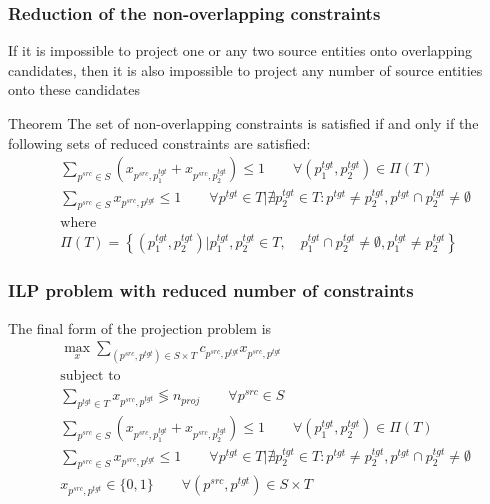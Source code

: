 \documentclass{beamer}
\newcommand{\src}[1]{#1^{src}}
\newcommand{\tgt}[1]{#1^{tgt}}
\begin{document}
\begin{frame}
  \frametitle{Reduction of the non-overlapping constraints}

  If it is impossible to project one or any two source entities onto overlapping
  candidates, then it is also impossible to project any number of source entities
  onto these candidates

  \begin{block}{Theorem}
    The set of non-overlapping constraints is satisfied if and only if
    the following sets of reduced constraints are satisfied:
    \begin{align*}
      & \sum\limits_{\src{p} \in S} (x_{\src{p}, \tgt{p_1}} + x_{\src{p}, \tgt{p_2}}) \leq 1
      \qquad \forall (\tgt{p_1}, \tgt{p_2}) \in \Pi(T) \\
      & \sum\limits_{\src{p} \in S} x_{\src{p}, \tgt{p}} \leq 1
      \qquad \forall \tgt{p} \in T \Big| \nexists \tgt{p_2} \in T: \tgt{p} \neq \tgt{p_2}, \tgt{p} \cap \tgt{p_2} \neq \emptyset                                             \\
      & \text{where} \\
      & \Pi(T) = \left\{ (\tgt{p_1}, \tgt{p_2}) \Big| \tgt{p_1}, \tgt{p_2} \in T,
        \quad \tgt{p_1} \cap \tgt{p_2} \neq \emptyset,
      \tgt{p_1} \neq \tgt{p_2} \right\}
    \end{align*}
  \end{block}

\end{frame}

\begin{frame}
  \frametitle{ILP problem with reduced number of constraints}
  The final form of the projection problem is
  \begin{align*}
    & \max\limits_x \sum\limits_{(\src{p}, \tgt{p}) \in S \times T} c_{\src{p}, \tgt{p}} x_{\src{p}, \tgt{p}}                                                                                                                       \\
    & \text{subject to}                                                                                                                                                                                                             \\
    & \sum\limits_{\tgt{p} \in T} x_{\src{p}, \tgt{p}} \lessgtr n_{proj}
    \qquad \forall \src{p} \in S                                                                                               \\
    & \sum\limits_{\src{p} \in S} (x_{\src{p}, \tgt{p_1}} + x_{\src{p}, \tgt{p_2}}) \leq 1
    \qquad \forall (\tgt{p_1}, \tgt{p_2}) \in \Pi(T)                                                                           \\
    & \sum\limits_{\src{p} \in S} x_{\src{p}, \tgt{p}} \leq 1
    \qquad \forall \tgt{p} \in T \Big| \nexists \tgt{p_2} \in T: \tgt{p} \neq \tgt{p_2}, \tgt{p} \cap \tgt{p_2} \neq \emptyset \\
    & x_{\src{p}, \tgt{p}} \in \{ 0, 1 \}
    \qquad \forall (\src{p}, \tgt{p}) \in S \times T
  \end{align*}
\end{frame}
\end{document}

